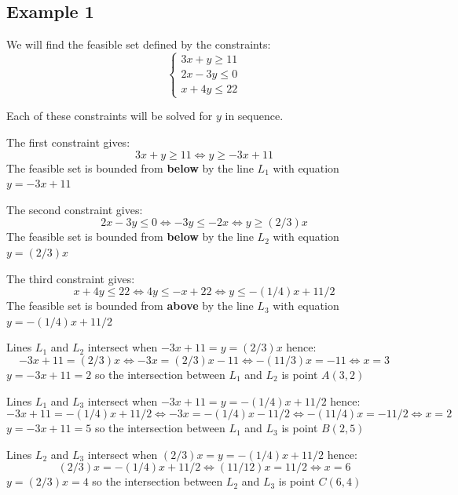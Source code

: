 \documentclass{article}
\begin{document}
\subsection*{Example 1}

We will find the feasible set defined by the constraints:
\[\left\{\begin{array}{c} 
3x + y \geq 11 \\
2x - 3y \leq 0 \\
x + 4y \leq 22
\end{array}\right.\]

Each of these constraints will be solved for \(y\) in sequence.

\vspace{5mm}

The first constraint gives:
\[3x + y \geq 11 \iff y \geq -3x + 11\]
The feasible set is bounded from {\bf below} by the line \(L_1\) with equation \(y = -3x + 11\)

\vspace{5mm}

The second constraint gives:
\[2x - 3y \leq 0 \iff -3y \leq -2x \iff y \geq (2/3)x\]
The feasible set is bounded from {\bf below} by the line \(L_2\) with equation \(y = (2/3)x\)

\vspace{5mm}

The third constraint gives:
\[x + 4y \leq 22 \iff 4y \leq -x + 22 \iff y \leq -(1/4)x + 11/2\]
The feasible set is bounded from {\bf above} by the line \(L_3\) with equation \(y = -(1/4)x + 11/2\)

\vspace{5mm}

Lines \(L_1\) and \(L_2\) intersect when \(-3x + 11 = y = (2/3)x\) hence:
\[-3x + 11 = (2/3)x \iff -3x = (2/3)x - 11 \iff -(11/3)x = -11 \iff x = 3\]
\(y = -3x + 11 = 2\) so the intersection between \(L_1\) and \(L_2\) is point \(A(3, 2)\)

\vspace{5mm}

Lines \(L_1\) and \(L_3\) intersect when \(-3x + 11 = y = -(1/4)x + 11/2\) hence:
\[-3x + 11 = -(1/4)x + 11/2 \iff -3x = -(1/4)x - 11/2 \iff -(11/4)x = -11/2 \iff x = 2\]
\(y = -3x + 11 = 5\) so the intersection between \(L_1\) and \(L_3\) is point \(B(2, 5)\)

\vspace{5mm}

Lines \(L_2\) and \(L_3\) intersect when \((2/3)x = y = -(1/4)x + 11/2\) hence:
\[(2/3)x = -(1/4)x + 11/2 \iff (11/12)x = 11/2 \iff x = 6\]
\(y = (2/3)x = 4\) so the intersection between \(L_2\) and \(L_3\) is point \(C(6, 4)\)
\end{document}
